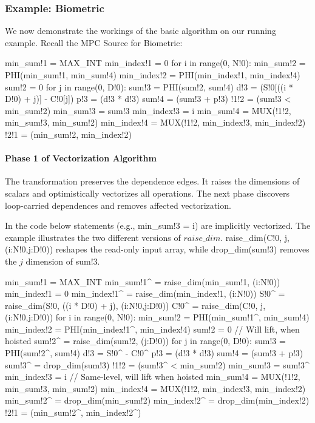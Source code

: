 
%

\subsubsection{Example: Biometric}

We now demonstrate the workings of the basic algorithm on our running example. Recall the MPC Source for Biometric:

{\small
\begin{pythonn}
min_sum!1 = MAX_INT
min_index!1 = 0
for i in range(0, N!0):
   min_sum!2 = PHI(min_sum!1, min_sum!4)
   min_index!2 = PHI(min_index!1, min_index!4)
   sum!2 = 0
   for j in range(0, D!0):
     sum!3 = PHI(sum!2, sum!4)
     d!3 = (S!0[((i * D!0) + j)] - C!0[j])
     p!3 = (d!3 * d!3)
     sum!4 = (sum!3 + p!3)
   !1!2 = (sum!3 < min_sum!2)
   min_sum!3 = sum!3
   min_index!3 = i
   min_sum!4 = MUX(!1!2, min_sum!3, min_sum!2)
   min_index!4 = MUX(!1!2, min_index!3, min_index!2)
!2!1 = (min_sum!2, min_index!2)   
\end{pythonn}
}

\paragraph{Phase 1 of Vectorization Algorithm}

The transformation preserves the dependence edges. It raises the dimensions of scalars and optimistically vectorizes all operations. 
The next phase discovers loop-carried dependences and removes affected vectorization.

In the code below statements (e.g., {\sf min\_sum!3 = i}) are implicitly vectorized. 
The example illustrates the two different versions of $\mathit{raise\_dim}$. {\sf raise\_dim(C!0, j, (i:N!0,j:D!0))} reshapes
the read-only input array, while {\sf drop\_dim(sum!3)} removes the $j$ dimension of {\sf sum!3}.

{\small
\begin{pythonn}
min_sum!1 = MAX_INT
min_sum!1^ = raise_dim(min_sum!1, (i:N!0))
min_index!1 = 0
min_index!1^ = raise_dim(min_index!1, (i:N!0))
S!0^ = raise_dim(S!0, ((i * D!0) + j), (i:N!0,j:D!0))
C!0^ = raise_dim(C!0, j, (i:N!0,j:D!0))
for i in range(0, N!0):
   min_sum!2 = PHI(min_sum!1^, min_sum!4)
   min_index!2 = PHI(min_index!1^, min_index!4) 
   sum!2 = 0 // Will lift, when hoisted
   sum!2^ = raise_dim(sum!2, (j:D!0)) 
   for j in range(0, D!0):
      sum!3 = PHI(sum!2^, sum!4)
      d!3 = S!0^ - C!0^
      p!3 = (d!3 * d!3) 
      sum!4 = (sum!3 + p!3)
   sum!3^ = drop_dim(sum!3)     
   !1!2 = (sum!3^ < min_sum!2)
   min_sum!3 = sum!3^
   min_index!3 = i  // Same-level, will lift when hoisted
   min_sum!4 = MUX(!1!2, min_sum!3, min_sum!2)
   min_index!4 = MUX(!1!2, min_index!3, min_index!2)
min_sum!2^ = drop_dim(min_sum!2)
min_index!2^ = drop_dim(min_index!2)   
!2!1 = (min_sum!2^, min_index!2^)     
\end{pythonn}
}

